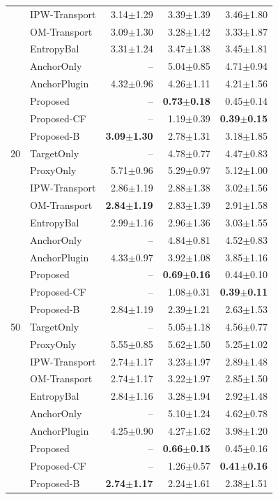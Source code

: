 \begin{table}[t]
\begin{tabular}{@{}cl|rrr@{}}
 & IPW-Transport & 3.14$\pm$1.29 & 3.39$\pm$1.39 & 3.46$\pm$1.80 \\
 & OM-Transport & 3.09$\pm$1.30 & 3.28$\pm$1.42 & 3.33$\pm$1.87 \\
 & EntropyBal & 3.31$\pm$1.24 & 3.47$\pm$1.38 & 3.45$\pm$1.81 \\
 & AnchorOnly & -- & 5.04$\pm$0.85 & 4.71$\pm$0.94 \\
 & AnchorPlugin & 4.32$\pm$0.96 & 4.26$\pm$1.11 & 4.21$\pm$1.56 \\
 & Proposed & -- & \textbf{0.73$\pm$0.18} & 0.45$\pm$0.14 \\
 & Proposed-CF & -- & 1.19$\pm$0.39 & \textbf{0.39$\pm$0.15} \\
 & Proposed-B & \textbf{3.09$\pm$1.30} & 2.78$\pm$1.31 & 3.18$\pm$1.85 \\
\midrule
20 & TargetOnly & -- & 4.78$\pm$0.77 & 4.47$\pm$0.83 \\
 & ProxyOnly & 5.71$\pm$0.96 & 5.29$\pm$0.97 & 5.12$\pm$1.00 \\
 & IPW-Transport & 2.86$\pm$1.19 & 2.88$\pm$1.38 & 3.02$\pm$1.56 \\
 & OM-Transport & \textbf{2.84$\pm$1.19} & 2.83$\pm$1.39 & 2.91$\pm$1.58 \\
 & EntropyBal & 2.99$\pm$1.16 & 2.96$\pm$1.36 & 3.03$\pm$1.55 \\
 & AnchorOnly & -- & 4.84$\pm$0.81 & 4.52$\pm$0.83 \\
 & AnchorPlugin & 4.33$\pm$0.97 & 3.92$\pm$1.08 & 3.85$\pm$1.16 \\
 & Proposed & -- & \textbf{0.69$\pm$0.16} & 0.44$\pm$0.10 \\
 & Proposed-CF & -- & 1.08$\pm$0.31 & \textbf{0.39$\pm$0.11} \\
 & Proposed-B & 2.84$\pm$1.19 & 2.39$\pm$1.21 & 2.63$\pm$1.53 \\
\midrule
50 & TargetOnly & -- & 5.05$\pm$1.18 & 4.56$\pm$0.77 \\
 & ProxyOnly & 5.55$\pm$0.85 & 5.62$\pm$1.50 & 5.25$\pm$1.02 \\
 & IPW-Transport & 2.74$\pm$1.17 & 3.23$\pm$1.97 & 2.89$\pm$1.48 \\
 & OM-Transport & 2.74$\pm$1.17 & 3.22$\pm$1.97 & 2.85$\pm$1.50 \\
 & EntropyBal & 2.84$\pm$1.16 & 3.28$\pm$1.94 & 2.92$\pm$1.48 \\
 & AnchorOnly & -- & 5.10$\pm$1.24 & 4.62$\pm$0.78 \\
 & AnchorPlugin & 4.25$\pm$0.90 & 4.27$\pm$1.62 & 3.98$\pm$1.20 \\
 & Proposed & -- & \textbf{0.66$\pm$0.15} & 0.45$\pm$0.16 \\
 & Proposed-CF & -- & 1.26$\pm$0.57 & \textbf{0.41$\pm$0.16} \\
 & Proposed-B & \textbf{2.74$\pm$1.17} & 2.24$\pm$1.61 & 2.38$\pm$1.51 \\
\bottomrule
\end{tabular}
\end{table}